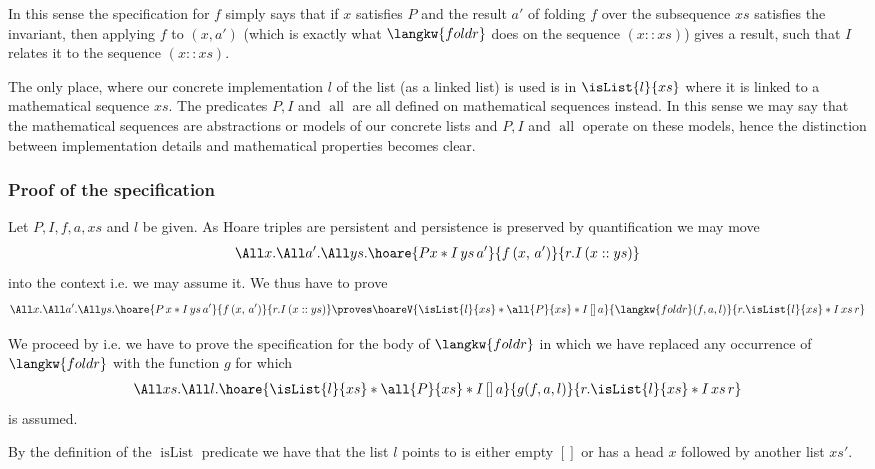 In this sense the specification for $f$ simply says that if $x$ satisfies $P$ and the result $a'$ of folding $f$ over the subsequence $xs$ satisfies the invariant, then applying $f$ to $(x, a')$ (which is exactly what $\langkw{foldr}$ does on the sequence $(x::xs)$) gives a result, such that $I$ relates it to the sequence $(x::xs)$.

\begin{remark}
  The only place, where our concrete implementation $l$ of the list (as a linked list) is used is in $\isList {l} {xs}$ where it is linked to a mathematical sequence $xs$.
  The predicates $P, I$ and $\operatorname{all}$ are all defined on mathematical sequences instead.
  In this sense we may say that the mathematical sequences are abstractions or models of our concrete lists and $P, I$ and $\operatorname{all}$ operate on these models, hence the distinction between implementation details and mathematical properties becomes clear.
\end{remark}

\subsubsection*{Proof of the specification}
Let $P, I, f, a, xs$ and $l$ be given. As Hoare triples are persistent and persistence is preserved by quantification we may move 
\begin{align*}
\All x. \All a'. \All ys. \hoare{P x \ast I \, ys \, a'}{f \, (x, \, a')}{r. I\, (x::ys)}
 \end{align*} 
 into the context i.e. we may assume it. We thus have to prove
\begin{align*}
\All x. \All a'. \All ys. \hoare{P \, x \ast I \, ys \, a'}{f \, (x, \, a')}{r. I\, (x::ys)}
\proves \hoareV
{ \isList {l} {xs} \ast \all {P} {xs} \ast  I \, [] \, a}
{\langkw{foldr}(f, a, l)}
{r.  \isList {l} {xs} \ast I \, xs\, r}
\end{align*}

We proceed by  i.e. we have to prove the specification for the body of $\langkw{foldr}$ in which we have replaced any occurrence of $\langkw{foldr}$ with the function $g$ for which
\begin{align*}
\All xs. \All l. \hoare{ \isList {l} {xs} \ast \all {P} {xs} \ast  I \, [] \, a}
 {g(f, a, l)}
{r.  \isList {l} {xs} \ast I \, xs\, r}
\end{align*}
is assumed.

By the definition of the $\operatorname{isList}$ predicate we have that the list $l$ points to is either empty $[]$ or has a head $x$ followed by another list $xs'$.  

